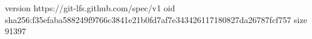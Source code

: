 version https://git-lfs.github.com/spec/v1
oid sha256:f35efaba588249f9766c3841e21b0fd7af7e343426117180827da26787fcf757
size 91397

